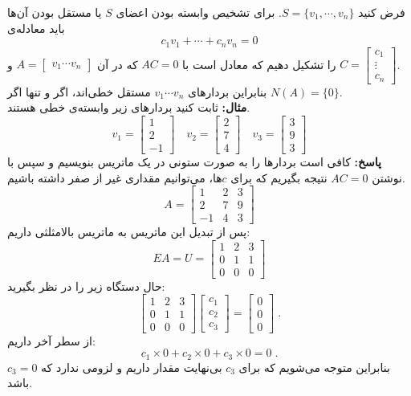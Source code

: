 فرض کنید $S= \{v_1,\cdots,v_n\}$. برای تشخیص وابسته بودن اعضا‌ی $S$ یا مستقل بودن آن‌ها باید معادله‌ی 
$$c_1v_1+\cdots+c_nv_n=0$$
را تشکیل دهیم که معادل است با $AC=0$ که در آن $A=\begin{bmatrix}
v_1\cdots v_n
\end{bmatrix}$ و $C=\begin{bmatrix}
c_1\\ \vdots \\ c_n
\end{bmatrix}$.\\
بنابراین بردار‌های $v_1\cdots v_n$ مستقل خطی‌اند، اگر و تنها اگر $N(A)=\{0\}$.\\
\textbf{مثال:}
ثابت کنید بردار‌های زیر وابسته‌ی خطی هستند.
$$v_1=\begin{bmatrix}
1\\2\\-1
\end{bmatrix}\quad v_2=\begin{bmatrix}
2\\7\\4
\end{bmatrix} \quad v_3=\begin{bmatrix}
3\\9\\3
\end{bmatrix}$$
\textbf{پاسخ:}
کافی است بردار‌ها را به صورت ستونی در یک ماتریس بنویسیم و سپس با نوشتن $AC=0$ نتیجه بگیریم که برای $c$ها، می‌توانیم مقداری غیر از صفر داشته باشیم.
$$A=\begin{bmatrix}
1&2&3\\
2&7&9\\
-1&4&3
\end{bmatrix}$$
پس از تبدیل این ماتریس به ماتریس بالا‌مثلثی داریم:
$$EA = U =\begin{bmatrix}
1&2&3\\
0&1&1\\
0&0&0
\end{bmatrix}$$
حال دستگاه زیر را در نظر بگیرید:
$$\begin{bmatrix}
1&2&3\\
0&1&1\\
0&0&0
\end{bmatrix}\begin{bmatrix}
c_1\\
c_2\\
c_3
\end{bmatrix}=\begin{bmatrix}
0\\
0\\
0
\end{bmatrix} \; .$$
از سطر آخر داریم:
$$c_1\times 0+ c_2\times 0+ c_3\times 0 = 0 \; .$$
بنابراین متوجه می‌شویم که برای $c_3$ بی‌نهایت مقدار داریم و لزومی ندارد که $c_3=0$ باشد.

